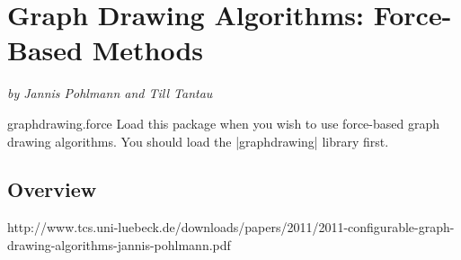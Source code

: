 %
%
%

\section{Graph Drawing Algorithms: Force-Based Methods}
\label{section-library-graphdrawing-force-based}

{\emph{by Jannis Pohlmann and Till Tantau}}


\begin{tikzlibrary}{graphdrawing.force}
  Load this package when you wish to use force-based graph drawing
  algorithms. You should load the |graphdrawing| library first.
\end{tikzlibrary}

\subsection{Overview}


http://www.tcs.uni-luebeck.de/downloads/papers/2011/2011-configurable-graph-drawing-algorithms-jannis-pohlmann.pdf






